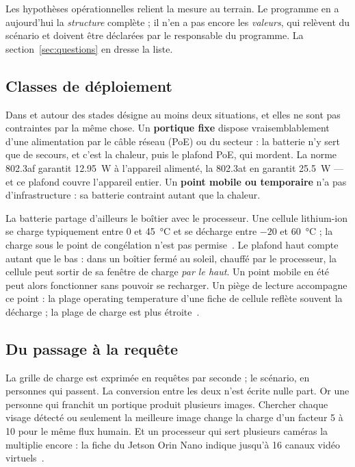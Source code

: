 \documentclass[11pt,a4paper]{article}
\begin{document}
Les hypothèses opérationnelles relient la mesure au terrain. Le programme en a
aujourd'hui la \emph{structure} complète ; il n'en a pas encore les \emph{valeurs},
qui relèvent du scénario et doivent être déclarées par le responsable du programme.
La section~\ref{sec:questions} en dresse la liste.

\subsection{Classes de déploiement}

\og Dans et autour des stades \fg{} désigne au moins deux situations, et elles ne sont
pas contraintes par la même chose. Un \textbf{portique fixe} dispose vraisemblablement
d'une alimentation par le câble réseau (PoE) ou du secteur : la batterie n'y sert que
de secours, et c'est la chaleur, puis le plafond PoE, qui mordent. La norme 802.3af
garantit \num{12,95}~W à l'appareil alimenté, la 802.3at en garantit \num{25,5}~W — et
ce plafond couvre l'appareil entier. Un \textbf{point mobile ou temporaire} n'a pas
d'infrastructure : sa batterie contraint autant que la chaleur.

La batterie partage d'ailleurs le boîtier avec le processeur. Une cellule lithium-ion
se charge typiquement entre 0 et \SI{45}{\celsius} et se décharge entre $-20$ et
\SI{60}{\celsius} ; la charge sous le point de congélation n'est pas permise~\cite{bu410}.
Le plafond haut compte autant que le bas : dans un boîtier fermé au soleil, chauffé
par le processeur, la cellule peut sortir de sa fenêtre de charge \emph{par le haut}.
Un point mobile en été peut alors fonctionner sans pouvoir se recharger. Un piège de
lecture accompagne ce point : la plage \og operating temperature \fg{} d'une fiche de
cellule reflète souvent la décharge ; la plage de charge est plus étroite~\cite{sunlith}.

\subsection{Du passage à la requête}

La grille de charge est exprimée en requêtes par seconde ; le scénario, en personnes
qui passent. La conversion entre les deux n'est écrite nulle part. Or une personne
qui franchit un portique produit plusieurs images. Chercher chaque visage détecté ou
seulement la meilleure image change la charge d'un facteur 5 à 10 pour le même flux
humain. Et un processeur qui sert plusieurs caméras la multiplie encore : la fiche du
Jetson Orin Nano indique jusqu'à 16 canaux vidéo virtuels~\cite{nvds}.
\end{document}
